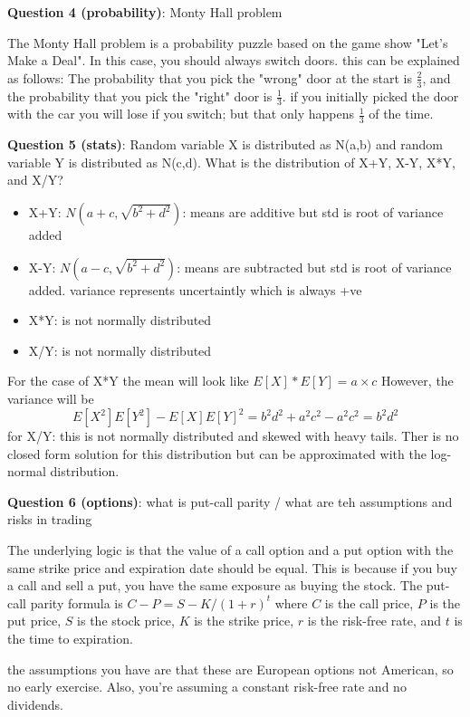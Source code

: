 \documentclass[a4paper,10pt]{article}
\begin{document}
\vspace{0.5cm} 
\noindent
\textbf{Question 4 (probability)}: Monty Hall problem
\vspace{0.25cm}
\noindent
\begin{sloppypar}
        The Monty Hall problem is a probability puzzle based on the game show "Let's Make a Deal". 
        In this case, you should always switch doors. this can be explained as follows:
        The probability that you pick the "wrong" door at the start is $\frac{2}{3}$, 
        and the probability that you pick the "right" door is $\frac{1}{3}$.
        if you initially picked the door with the car you will lose if you switch;
        but that only happens $\frac{1}{3}$ of the time.
\end {sloppypar}
\vspace{0.5cm}
\noindent
\textbf{Question 5 (stats)}: Random variable X is distributed as N(a,b) and random variable Y is distributed as N(c,d). What is the distribution of X+Y, X-Y, X*Y, and X/Y?
\vspace{0.25cm}
\noindent
\begin{sloppypar}
    \begin{itemize}
        \item{X+Y: $N(a+c, \sqrt{b^2+d^2})$}: means are additive but std is root of variance added
        \item {X-Y: $N(a-c, \sqrt{b^2+d^2})$}: means are subtracted but std is root of variance added. variance represents uncertaintly which is always +ve
        \item {X*Y}: is not normally distributed 
        \item {X/Y}: is not normally distributed
    \end{itemize}
    
    For the case of X*Y the mean will look like $E[X] * E[Y] = a \times c$
    However, the variance will be 
    $$E[X^2]E[Y^2] - E[X]E[Y]^2 = b^2d^2 + a^2c^2 - a^2c^2 = b^2d^2$$
    for X/Y: this is not normally distributed and skewed with heavy tails. 
            Ther is no closed form solution for this distribution but can be approximated with the log-normal distribution.

\end{sloppypar}
\vspace{0.5cm}
\noindent
\textbf{Question 6 (options)}: what is put-call parity / what are teh assumptions and risks in trading
\vspace{0.25cm}
\noindent
\begin{sloppypar}
    The underlying logic is that the value of a call option and a put option with the same strike price and expiration date should be equal.
    This is because if you buy a call and sell a put, you have the same exposure as buying the stock.
    The put-call parity formula is $C - P = S - K/(1+r)^t$ where $C$ is the call price, $P$ is the put price, $S$ is the stock price, $K$ is the strike price, $r$ is the risk-free rate, and $t$ is the time to expiration.

    the assumptions you have are that these are European options not American, so no early exercise. 
    Also, you're assuming a constant risk-free rate and no dividends.
\end{sloppypar}
\end{document}
